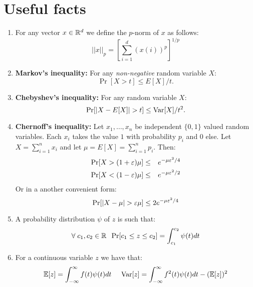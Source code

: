 \documentclass{article}
\begin{document}
\section*{Useful facts}
\begin{enumerate}
\item For any vector $x \in {\mathbb{R}}^{d}$ we define the $p$-norm of $x$ as
follows:
\[
||x||_p = [\sum_{i=1}^{d}(x(i))^p]^{1/p}
\]

\item {\bf Markov's inequality:} For any {\it non-negative} random variable
$X$:
\[
\Pr[X > t] \le E[X]/t.
\]
\item {\bf Chebyshev's inequality:} For any random variable $X$:
\[
\Pr[|X - E[X]| > t] \le {\operatorname{Var}}[X]/t^2.
\]
\item {\bf Chernoff's inequality:} Let $x_1,\ldots,x_n$ be independent
$\{0,1\}$ valued random variables. Each $x_i$ takes the value $1$
with probability $p_i$ and $0$ else. Let $X = \sum_{i=1}^{n}x_i$ and
let $\mu = E[X] = \sum_{i=1}^{n}p_i$. Then:
\begin{eqnarray*}
\Pr[X > (1+\varepsilon)\mu] &\le& e^{-\mu \varepsilon^2/4}\\
\Pr[X < (1-\varepsilon)\mu] &\le& e^{-\mu \varepsilon^2/2}
\end{eqnarray*}
Or in a another convenient form:
\[
\Pr[|X - \mu| > \varepsilon\mu] \le 2e^{-\mu \varepsilon^2/4}
\]
\item A probability distribution $\psi$ of $z$ is such that:
\[
\forall \; c_1,c_2 \in {\mathbb{R}} \;\; \Pr[c_1 \le z \le c_2]  = \int_{c_1}^{c_2}\psi(t)dt
\]

\item For a continuous variable $z$ we have that:
\[%
\E[z] = \int_{-\infty}^{\infty} f(t)\psi(t)dt \;\;\;\;\;
\Var[z] = \int_{-\infty}^{\infty} f^2(t)\psi(t)dt - (\E[z])^2
\]%

\end{enumerate}

\pagebreak
\end{document}
